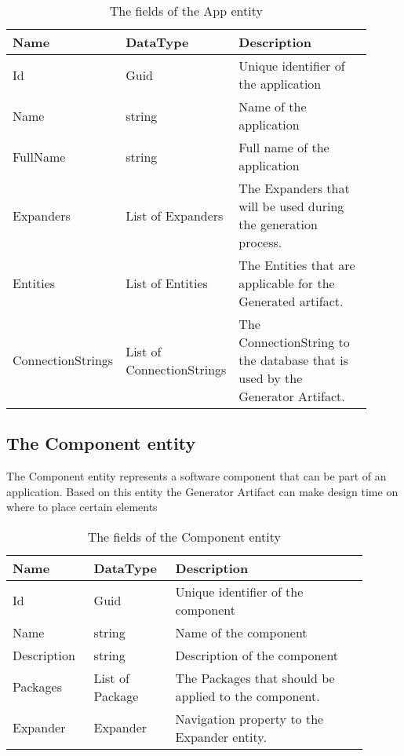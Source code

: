 \begin{table}[H]
    \small
    \begin{tabular}{ p{0.21\linewidth} p{0.21\linewidth} p{0.49\linewidth} }
        \hline
        \textbf{Name} & \textbf{DataType} & \textbf{Description} \\
        \hline
        Id & Guid & Unique identifier of the application \\
        Name & string & Name of the application \\
        FullName & string & Full name of the application \\
        Expanders & List of Expanders & The Expanders that will be used during the
        generation process. \\
        Entities & List of Entities & The Entities that are applicable for the Generated artifact. \\
        ConnectionStrings & List of ConnectionStrings & The ConnectionString to the
        database that is used by the Generator Artifact. \\
        \hline
    \end{tabular}
    \caption{The fields of the App entity}
    \label{table:app_entity}
\end{table}

\subsection{The Component entity}

The Component entity represents a software component that can be part of an application.
Based on this entity the Generator Artifact can make design time on where to place certain
elements  

\begin{table}[H]
\small
\begin{tabular}{ p{0.20\linewidth} p{0.20\linewidth} p{0.50\linewidth} }
\hline
\textbf{Name} & \textbf{DataType} & \textbf{Description} \\
\hline
Id & Guid & Unique identifier of the component \\
Name & string & Name of the component \\
Description & string & Description of the component \\
Packages & List of Package & The Packages that should be applied to the component. \\
Expander & Expander & Navigation property to the Expander entity. \\
\hline
\end{tabular}
\caption{The fields of the Component entity}
\label{table:component_entity}
\end{table}

